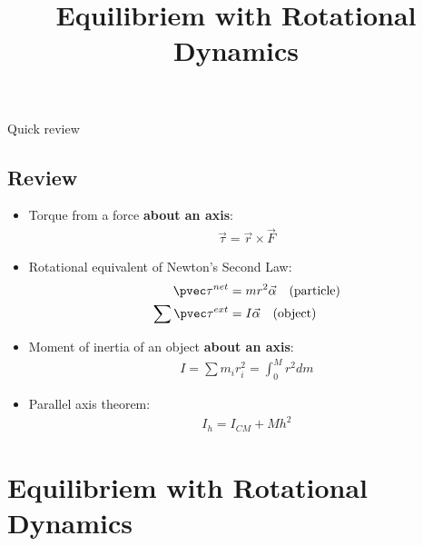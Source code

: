 \documentclass[aspectratio=169,
hyperref={colorlinks,urlcolor=blue}
]{beamer}
\begin{document}
\begin{frame}{Quick review}
\subsection{Review}
\label{subsec:review}
\begin{itemize}
\item Torque from a force \textbf{about an axis}:
\begin{align*}
\vec \tau =\vec r \times \vec F
\end{align*}
\item Rotational equivalent of Newton's Second Law:
\begin{align*}
\pvec \tau^{net}&=mr^2\vec \alpha\quad \text{(particle)}\\
\sum \pvec \tau^{ext}&=I\vec \alpha\quad \text{(object)}
\end{align*}
\item Moment of inertia of an object \textbf{about an axis}:
\begin{align*}
I=\sum m_ir_i^2  =\int_0^M r^2 dm
\end{align*}
\item Parallel axis theorem:
\begin{align*}
I_h=I_{CM}+Mh^2
\end{align*}
\end{itemize}
\end{frame}









\section{Equilibriem with Rotational Dynamics}
\label{sec:equilibirem}
\title{Equilibriem with Rotational Dynamics}
\author{\insertsubsection}


\begin{frame}
\titlepage
\thispagestyle{empty}
\end{frame}






\end{document}
